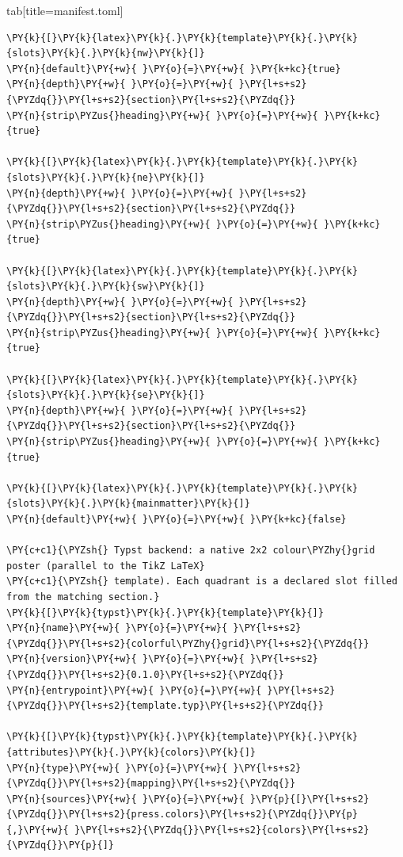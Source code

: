 \documentclass[a4paper,twoside]{article}
\begin{document}
\begin{tsdiv}{tab}[title=manifest.toml]
\begin{tscode}[lang=toml, engine=pygments]
\begin{Verbatim}[commandchars=\\\{\},breaklines, breakanywhere, commandchars=\\\{\}]
\PY{k}{[}\PY{k}{latex}\PY{k}{.}\PY{k}{template}\PY{k}{.}\PY{k}{slots}\PY{k}{.}\PY{k}{nw}\PY{k}{]}
\PY{n}{default}\PY{+w}{ }\PY{o}{=}\PY{+w}{ }\PY{k+kc}{true}
\PY{n}{depth}\PY{+w}{ }\PY{o}{=}\PY{+w}{ }\PY{l+s+s2}{\PYZdq{}}\PY{l+s+s2}{section}\PY{l+s+s2}{\PYZdq{}}
\PY{n}{strip\PYZus{}heading}\PY{+w}{ }\PY{o}{=}\PY{+w}{ }\PY{k+kc}{true}

\PY{k}{[}\PY{k}{latex}\PY{k}{.}\PY{k}{template}\PY{k}{.}\PY{k}{slots}\PY{k}{.}\PY{k}{ne}\PY{k}{]}
\PY{n}{depth}\PY{+w}{ }\PY{o}{=}\PY{+w}{ }\PY{l+s+s2}{\PYZdq{}}\PY{l+s+s2}{section}\PY{l+s+s2}{\PYZdq{}}
\PY{n}{strip\PYZus{}heading}\PY{+w}{ }\PY{o}{=}\PY{+w}{ }\PY{k+kc}{true}

\PY{k}{[}\PY{k}{latex}\PY{k}{.}\PY{k}{template}\PY{k}{.}\PY{k}{slots}\PY{k}{.}\PY{k}{sw}\PY{k}{]}
\PY{n}{depth}\PY{+w}{ }\PY{o}{=}\PY{+w}{ }\PY{l+s+s2}{\PYZdq{}}\PY{l+s+s2}{section}\PY{l+s+s2}{\PYZdq{}}
\PY{n}{strip\PYZus{}heading}\PY{+w}{ }\PY{o}{=}\PY{+w}{ }\PY{k+kc}{true}

\PY{k}{[}\PY{k}{latex}\PY{k}{.}\PY{k}{template}\PY{k}{.}\PY{k}{slots}\PY{k}{.}\PY{k}{se}\PY{k}{]}
\PY{n}{depth}\PY{+w}{ }\PY{o}{=}\PY{+w}{ }\PY{l+s+s2}{\PYZdq{}}\PY{l+s+s2}{section}\PY{l+s+s2}{\PYZdq{}}
\PY{n}{strip\PYZus{}heading}\PY{+w}{ }\PY{o}{=}\PY{+w}{ }\PY{k+kc}{true}

\PY{k}{[}\PY{k}{latex}\PY{k}{.}\PY{k}{template}\PY{k}{.}\PY{k}{slots}\PY{k}{.}\PY{k}{mainmatter}\PY{k}{]}
\PY{n}{default}\PY{+w}{ }\PY{o}{=}\PY{+w}{ }\PY{k+kc}{false}

\PY{c+c1}{\PYZsh{} Typst backend: a native 2x2 colour\PYZhy{}grid poster (parallel to the TikZ LaTeX}
\PY{c+c1}{\PYZsh{} template). Each quadrant is a declared slot filled from the matching section.}
\PY{k}{[}\PY{k}{typst}\PY{k}{.}\PY{k}{template}\PY{k}{]}
\PY{n}{name}\PY{+w}{ }\PY{o}{=}\PY{+w}{ }\PY{l+s+s2}{\PYZdq{}}\PY{l+s+s2}{colorful\PYZhy{}grid}\PY{l+s+s2}{\PYZdq{}}
\PY{n}{version}\PY{+w}{ }\PY{o}{=}\PY{+w}{ }\PY{l+s+s2}{\PYZdq{}}\PY{l+s+s2}{0.1.0}\PY{l+s+s2}{\PYZdq{}}
\PY{n}{entrypoint}\PY{+w}{ }\PY{o}{=}\PY{+w}{ }\PY{l+s+s2}{\PYZdq{}}\PY{l+s+s2}{template.typ}\PY{l+s+s2}{\PYZdq{}}

\PY{k}{[}\PY{k}{typst}\PY{k}{.}\PY{k}{template}\PY{k}{.}\PY{k}{attributes}\PY{k}{.}\PY{k}{colors}\PY{k}{]}
\PY{n}{type}\PY{+w}{ }\PY{o}{=}\PY{+w}{ }\PY{l+s+s2}{\PYZdq{}}\PY{l+s+s2}{mapping}\PY{l+s+s2}{\PYZdq{}}
\PY{n}{sources}\PY{+w}{ }\PY{o}{=}\PY{+w}{ }\PY{p}{[}\PY{l+s+s2}{\PYZdq{}}\PY{l+s+s2}{press.colors}\PY{l+s+s2}{\PYZdq{}}\PY{p}{,}\PY{+w}{ }\PY{l+s+s2}{\PYZdq{}}\PY{l+s+s2}{colors}\PY{l+s+s2}{\PYZdq{}}\PY{p}{]}


\end{Verbatim}
\end{tscode}
\end{tsdiv}
\end{document}
